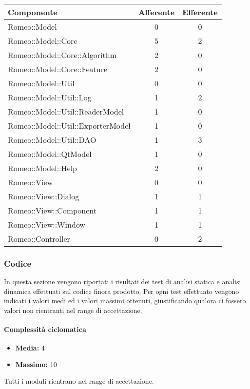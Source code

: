 \begin{tabular}{|p{7cm}|c|c|}
			\hline
			\textbf{Componente} &
			\textbf{Afferente} &
			\textbf{Efferente}\\
			\hline
			Romeo::Model & 0 & 0\\ 
			\hline
			Romeo::Model::Core & 5 & 2\\ 
			\hline
			Romeo::Model::Core::Algorithm & 2 & 0\\ 
			\hline
			Romeo::Model::Core::Feature & 2 & 0\\ 
			\hline
			Romeo::Model::Util & 0 & 0\\ 
			\hline
			Romeo::Model::Util::Log & 1 & 2\\ 
			\hline
			Romeo::Model::Util::ReaderModel & 1 & 0\\
			\hline
			Romeo::Model::Util::ExporterModel & 1 & 0\\
			\hline
			Romeo::Model::Util::DAO & 1 & 3\\
			\hline
			Romeo::Model::QtModel & 1 & 0\\
			\hline
			Romeo::Model::Help & 2 & 0\\
			\hline
			Romeo::View & 0 & 0\\
			\hline
			Romeo::View::Dialog & 1 & 1\\
			\hline
			Romeo::View::Component & 1 & 1\\
			\hline
			Romeo::View::Window & 1 & 1\\
			\hline
			Romeo::Controller & 0 & 2\\
			\hline
		\end{tabular}



\subsubsection{Codice}
\label{codeRQ}
In questa sezione vengono riportati i risultati dei test di analisi statica e analisi dinamica effettuati sul codice finora prodotto.
Per ogni test effettuato vengono indicati i valori medi ed i valori massimi ottenuti, giustificando qualora ci fossero valori non rientranti nel range di accettazione.
\paragraph{Complessità ciclomatica}
\begin{itemize}
\item{\textbf{Media:}} 4
\item{\textbf{Massimo:}} 10
\end{itemize}
Tutti i moduli rientrano nel range di accettazione.

